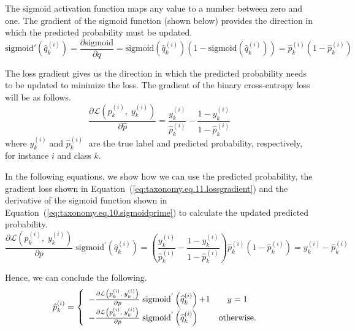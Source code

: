 The sigmoid activation function maps any value to a number between zero and one. The gradient of the sigmoid function (shown below) provides the direction in which the predicted probability must be updated.
\begin{equation}
    \label{eq:taxonomy.eq.10.sigmoidprime}
    \text{sigmoid}'\left(\widehat{q}_k^{(i)}\right)=\frac{\partial{\text{sigmoid}}}{\partial{q}}=\text{sigmoid}\left(\widehat{q}_k^{(i)}\right)\left(1-\text{sigmoid}\left(\widehat{q}_k^{(i)}\right)\right)=\widehat{p}_k^{(i)}\left(1-\widehat{p}_k^{(i)}\right)
\end{equation}

The loss gradient gives us the direction in which the predicted probability needs to be updated to minimize the loss. The gradient of the binary cross-entropy loss will be as follows.
\begin{equation}
    \label{eq:taxonomy.eq.11.lossgradient}
    \frac{\partial \mathcal{L} \left( \widehat{p}_k^{(i)},\;y_k^{(i)}\right)}{\partial \widehat{p}}=\frac{y_k^{(i)}}{\widehat{p}_k^{(i)}}-\frac{1-y_k^{(i)}}{1-\widehat{p}_k^{(i)}}
\end{equation}
where $y_k^{(i)}\; $and ${\widehat p}_k^{(i)}\; $ are the true label and predicted probability, respectively, for instance $i $ and class $k $.

In the following equations, we show how we can use the predicted probability, the gradient loss shown in Equation~(\ref{eq:taxonomy.eq.11.lossgradient}) and the derivative of the sigmoid function shown in Equation~(\ref{eq:taxonomy.eq.10.sigmoidprime}) to calculate the updated predicted probability.
\begin{equation}
\label{eq:taxonomy.eq.12.newpredelement}
\frac{\partial \mathcal{L}\left(p_k^{(i)},\; y_k^{(i)}\right)}{\partial p}\;\text{sigmoid}^{'}\left(\widehat{q}_k^{(i)}\right)=\left(\frac{y_k^{(i)}}{\widehat{p}_k^{(i)}}-\frac{1-y_k^{(i)}}{1-\widehat{p}_k^{(i)}}\right)\widehat{p}_k^{(i)}\left(1-\widehat{p}_k^{(i)}\right)=y_k^{(i)}-\widehat{p}_k^{(i)}
\end{equation}

Hence, we can conclude the following.
\begin{equation}
    \label{eq:taxonomy.eq.13.newpred}
    \begin{array}{@{}l}\hat{p}_{k}^{(i)} = \left\{\begin{array}{lc}-\frac{\partial \mathcal{L}\left(p_k^{(i)},\;y_k^{(i)}\right)}{\partial p}\;\text{sigmoid}^{'}\left(\widehat{q}_k^{(i)}\right)\text{+1} & y=1\\-\frac{\partial \mathcal{L}\left(p_k^{(i)},\;y_k^{(i)}\right)}{\partial p}\;\text{sigmoid}^{'}\left(\widehat{q}_k^{(i)}\right) & \text{otherwise.} \end{array}\right.\end{array}
\end{equation}

